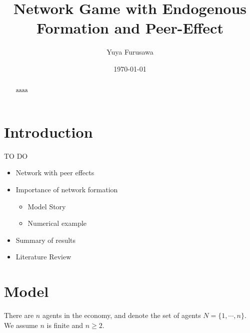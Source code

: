 \documentclass[12pt]{article}
\theoremstyle{definition}
\begin{document}
\title{Network Game with Endogenous Formation and Peer-Effect}

\author{Yuya Furusawa}

\date{\today}

\maketitle

\begin{abstract}
aaaa
\end{abstract}


\section{Introduction}

TO DO
\begin{itemize}
	\item Network with peer effects
	\item Importance of network formation
	\begin{itemize}
 		\item Model Story
 		\item Numerical example
 	\end{itemize}
 	\item Summary of results
  	\item Literature Review
\end{itemize}


\section{Model}

There are $n$ agents in the economy, and denote the set of agents $N = \{ 1, \cdots, n\}$.
We assume $n$ is finite and $n \ge 2$.
\end{document}
